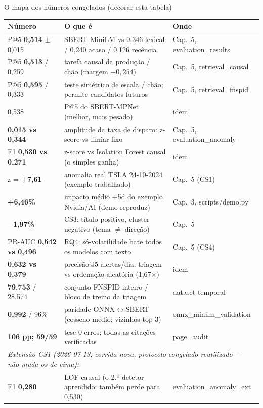 \documentclass[aspectratio=169,11pt]{beamer}
\begin{document}
\begin{frame}{O mapa dos números congelados (decorar esta tabela)}
\tiny
\renewcommand{\arraystretch}{0.96}
\begin{tabular}{l l l}
\toprule
\textbf{Número} & \textbf{O que é} & \textbf{Onde} \\
\midrule
P@5 \textbf{0,514} $\pm$ 0,015 & SBERT-MiniLM vs 0,346 lexical / 0,240 acaso / 0,126 recência & Cap.~5, evaluation\_results \\
P@5 \textbf{0,513} / 0,259 & tarefa causal da produção / chão (margem $+0,254$) & Cap.~5, retrieval\_causal \\
P@5 \textbf{0,595} / 0,333 & teste simétrico de escala / chão; permite candidatos futuros & Cap.~5, retrieval\_fnspid \\
0,538 & P@5 do SBERT-MPNet (melhor, mais pesado) & idem \\
\textbf{0,015 vs 0,344} & amplitude da taxa de disparo: z-score vs limiar fixo & Cap.~5, evaluation\_anomaly \\
F1 \textbf{0,530 vs 0,271} & z-score vs Isolation Forest causal (o simples ganha) & idem \\
z = \textbf{+7,61} & anomalia real TSLA 24-10-2024 (exemplo trabalhado) & Cap.~5 (CS1) \\
\textbf{+6,46\%} & impacto médio +5d do exemplo Nvidia/AI (demo reproduz) & Cap.~3, scripts/demo.py \\
\textbf{$-$1,97\%} & CS3: título positivo, cluster negativo (tema $\neq$ direção) & Cap.~5 \\
PR-AUC \textbf{0,542 vs 0,496} & RQ4: só-volatilidade bate todos os modelos com texto & Cap.~5 (CS4) \\
\textbf{0,632 vs 0,379} & precisão@5-alertas/dia: triagem vs ordenação aleatória (1,67$\times$) & idem \\
\textbf{79.753} / 28.574 & conjunto FNSPID inteiro / bloco de treino da triagem & dataset temporal \\
\textbf{0,992} / 96\% & paridade ONNX$\leftrightarrow$SBERT (cosseno médio; vizinhos top-3) & onnx\_minilm\_validation \\
\textbf{106 pp; 59/59} & tese 0 erros; todas as citações verificadas & page\_audit \\
\midrule
\multicolumn{3}{l}{\emph{Extensão CS1 (2026-07-13; corrida nova, protocolo congelado reutilizado — não muda os de cima):}} \\
F1 \textbf{0,280} & LOF causal (o 2.º detetor aprendido; também perde para 0,530) & evaluation\_anomaly\_ext \\

\end{tabular}
\end{frame}
\end{document}
